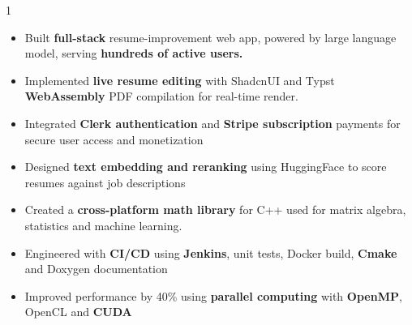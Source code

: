 \documentclass[11pt,a4paper,ragged2e]{altacv}
\begin{document}
\begin{paracol}{1}
\begin{itemize}
\item Built \textbf{full-stack} resume-improvement web app, powered by large language model, serving \textbf{hundreds of active users.}
\item Implemented \textbf{live resume editing} with ShadcnUI and Typst \textbf{WebAssembly} PDF compilation for real-time render.
\item Integrated \textbf{Clerk authentication} and \textbf{Stripe subscription} payments for secure user access and monetization
\item Designed \textbf{text embedding and reranking} using HuggingFace to score resumes against job descriptions
\end{itemize}
\tightdivider

\begin{itemize}
\item Created a \textbf{cross-platform math library} for C++ used for matrix algebra, statistics and machine learning.
\item Engineered with \textbf{CI/CD} using \textbf{Jenkins}, unit tests, Docker build, \textbf{Cmake} and Doxygen documentation
\item Improved performance by 40\% using \textbf{parallel computing} with \textbf{OpenMP}, OpenCL and \textbf{CUDA}
\end{itemize}






\end{paracol}
\end{document}
